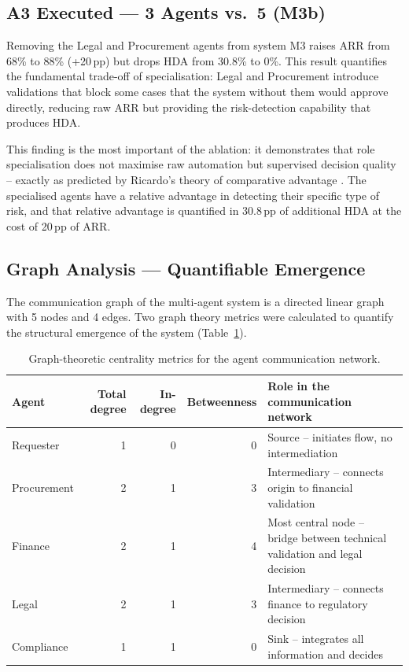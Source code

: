 \documentclass[preprint,12pt,authoryear]{elsarticle}
\begin{document}
\subsection{A3 Executed --- 3 Agents vs.\ 5 (M3b)}

Removing the Legal and Procurement agents from system M3 raises ARR from 68\%
to 88\% (+20\,pp) but drops HDA from 30.8\% to 0\%.
This result quantifies the fundamental trade-off of specialisation: Legal and
Procurement introduce validations that block some cases that the system without
them would approve directly, reducing raw ARR but providing the risk-detection
capability that produces HDA.

This finding is the most important of the ablation: it demonstrates that role
specialisation does not maximise raw automation but supervised decision quality
-- exactly as predicted by Ricardo's theory of comparative advantage
\citep{ricardo1817}.
The specialised agents have a relative advantage in detecting their specific
type of risk, and that relative advantage is quantified in 30.8\,pp of
additional HDA at the cost of 20\,pp of ARR.

\subsection{Graph Analysis --- Quantifiable Emergence}

The communication graph of the multi-agent system is a directed linear graph
with 5 nodes and 4 edges.
Two graph theory metrics were calculated to quantify the structural emergence of
the system (Table~\ref{tab:graph}).

\begin{table}[htbp]
\centering
\caption{Graph-theoretic centrality metrics for the agent communication network.}
\label{tab:graph}
\begin{tabularx}{\textwidth}{lrrrX}
\toprule
\textbf{Agent} & \textbf{Total degree} & \textbf{In-degree} &
  \textbf{Betweenness} & \textbf{Role in the communication network} \\
\midrule
Requester   & 1 & 0 & 0 & Source -- initiates flow, no intermediation \\
Procurement & 2 & 1 & 3 & Intermediary -- connects origin to financial validation \\
Finance     & 2 & 1 & 4 & Most central node -- bridge between technical validation and legal decision \\
Legal       & 2 & 1 & 3 & Intermediary -- connects finance to regulatory decision \\
Compliance  & 1 & 1 & 0 & Sink -- integrates all information and decides \\
\bottomrule
\end{tabularx}
\end{table}
\end{document}
